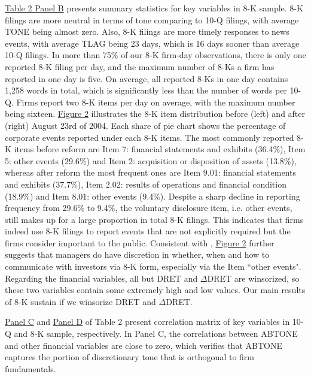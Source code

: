 \documentclass[a4paper]{article}
\begin{document}
\begin{spacing}{2}
\hyperref[T2PB]{Table 2 Panel B} presents summary statistics for key variables in 8-K sample. 8-K filings are more neutral in terms of tone comparing to 10-Q filings, with average TONE being almost zero. Also, 8-K filings are more timely responses to news events, with average TLAG being 23 days, which is 16 days sooner than average 10-Q filings. In more than 75\% of our 8-K firm-day observations, there is only one reported 8-K filing per day, and the maximum number of 8-Ks a firm has reported in one day is five. On average, all reported 8-Ks in one day contains 1,258 words in total, which is significantly less than the number of words per 10-Q. Firms report two 8-K items per day on average, with the maximum number being sixteen. \hyperref[fig2]{Figure 2} illustrates the 8-K item distribution before (left) and after (right) August 23rd of 2004. Each share of pie chart shows the percentage of corporate events reported under each 8-K items. The most commonly reported 8-K items before reform are Item 7: financial statements and exhibits (36.4\%), Item 5: other events (29.6\%) and Item 2: acquisition or disposition of assets (13.8\%), whereas after reform the most frequent ones are Item 9.01: financial statements and exhibits (37.7\%), Item 2.02: results of operations and financial condition (18.9\%) and Item 8.01: other events (9.4\%). Despite a sharp decline in reporting frequency from 29.6\% to 9.4\%, the voluntary disclosure item, i.e. other events, still makes up for a large proportion in total 8-K filings. This indicates that firms indeed use 8-K filings to report events that are not explicitly required but the firms consider important to the public. Consistent with \citet{baoManagersDiscloseWithhold2019}, \hyperref[fig2]{Figure 2} further suggests that managers do have discretion in whether, when and how to communicate with investors via 8-K form, especially via the Item ``other events". Regarding the financial variables, all but DRET and $\Delta$DRET are winsorized, so these two variables contain some extremely high and low values. Our main results of 8-K sustain if we winsorize DRET and $\Delta$DRET.

\hyperref[T2PC]{Panel C} and \hyperref[T2PD]{Panel D} of Table 2 present correlation matrix of key variables in 10-Q and 8-K sample, respectively. In Panel C, the correlations between ABTONE and other financial variables are close to zero, which verifies that ABTONE captures the portion of discretionary tone that is orthogonal to firm fundamentals. 


\end{spacing}
\end{document}
